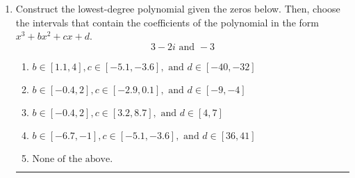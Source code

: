 \documentclass[14pt]{extbook}
\newcommand{\litem}[1]{\item#1\hspace*{-1cm}\rule{\textwidth}{0.4pt}}
\begin{document}
\begin{enumerate}
\litem{
Construct the lowest-degree polynomial given the zeros below. Then, choose the intervals that contain the coefficients of the polynomial in the form $x^3+bx^2+cx+d$.\[ 3 - 2 i \text{ and } -3 \]\begin{enumerate}[label=\Alph*.]
\item \( b \in [1.1, 4], c \in [-5.1, -3.6], \text{ and } d \in [-40, -32] \)
\item \( b \in [-0.4, 2], c \in [-2.9, 0.1], \text{ and } d \in [-9, -4] \)
\item \( b \in [-0.4, 2], c \in [3.2, 8.7], \text{ and } d \in [4, 7] \)
\item \( b \in [-6.7, -1], c \in [-5.1, -3.6], \text{ and } d \in [36, 41] \)
\item \( \text{None of the above.} \)


\end{enumerate}}
\end{enumerate}
\end{document}
